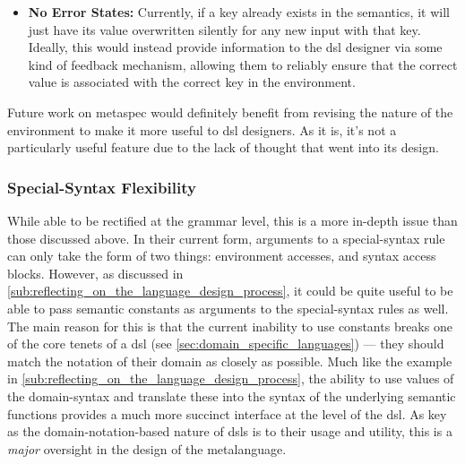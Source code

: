 \begin{itemize}
    While this is not a \textit{particularly onerous} restriction in the context of \glspl{dsl}, it would not impact the semantic correctness of the environment to allow it to work in a scoped fashion.
    Ideally, future revisions of \gls{metaspec} would allow this.
    \item \textbf{No Error States:} Currently, if a key already exists in the semantics, it will just have its value overwritten silently for any new input with that key.
    Ideally, this would instead provide information to the \gls{dsl} designer via some kind of feedback mechanism, allowing them to reliably ensure that the correct value is associated with the correct key in the environment.
\end{itemize}

Future work on \gls{metaspec} would definitely benefit from revising the nature of the environment to make it more useful to \gls{dsl} designers.
As it is, it's not a particularly useful feature due to the lack of thought that went into its design.


\subsubsection{Special-Syntax Flexibility} %
\label{ssub:special_syntax_flexibility}
While able to be rectified at the grammar level, this is a more in-depth issue than those discussed above. 
In their current form, arguments to a special-syntax rule can only take the form of two things: environment accesses, and syntax access blocks. 
However, as discussed in \autoref{sub:reflecting_on_the_language_design_process}, it could be quite useful to be able to pass semantic constants as arguments to the special-syntax rules as well.\\

The main reason for this is that the current inability to use constants breaks one of the core tenets of a \gls{dsl} (see \autoref{sec:domain_specific_languages}) --- they should match the notation of their domain as closely as possible.
Much like the example in \autoref{sub:reflecting_on_the_language_design_process}, the ability to use values of the domain-syntax and translate these into the syntax of the underlying semantic functions provides a much more succinct interface at the level of the \gls{dsl}.
As key as the domain-notation-based nature of \glspl{dsl} is to their usage and utility, this is a \textit{major} oversight in the design of the metalanguage.\\

